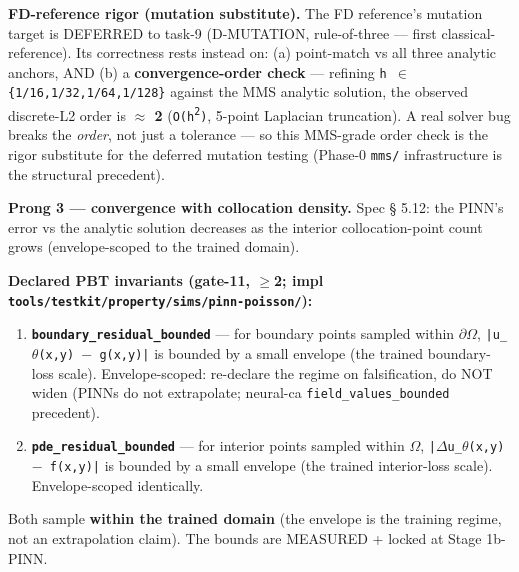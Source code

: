 \documentclass{bitphysics-preprint}
\begin{document}
\textbf{FD-reference rigor (mutation substitute).} The FD reference's mutation target is DEFERRED to task-9 (D-MUTATION, rule-of-three --- first classical-reference). Its correctness rests instead on: (a) point-match vs all three analytic anchors, AND (b) a \textbf{convergence-order check} --- refining \texttt{h $\in$ \{1/16,1/32,1/64,1/128\}} against the MMS analytic solution, the observed discrete-L2 order is \textbf{$\approx$ 2} (\texttt{O(h\textsuperscript{2})}, 5-point Laplacian truncation). A real solver bug breaks the \emph{order}, not just a tolerance --- so this MMS-grade order check is the rigor substitute for the deferred mutation testing (Phase-0 \texttt{mms/} infrastructure is the structural precedent).

\textbf{Prong 3 --- convergence with collocation density.} Spec \S{} 5.12: the PINN's error vs the analytic solution decreases as the interior collocation-point count grows (envelope-scoped to the trained domain).

\textbf{Declared PBT invariants (gate-11, $\geq$2; impl \texttt{tools/testkit/property/sims/pinn-poisson/}):}

\begin{enumerate}
  \item \textbf{\texttt{boundary\_residual\_bounded}} --- for boundary points sampled within \texttt{$\partial$$\Omega$}, \texttt{|u\_$\theta$(x,y) $-$ g(x,y)|} is bounded by a small envelope (the trained boundary-loss scale). Envelope-scoped: re-declare the regime on falsification, do NOT widen (PINNs do not extrapolate; neural-ca \texttt{field\_values\_bounded} precedent).
  \item \textbf{\texttt{pde\_residual\_bounded}} --- for interior points sampled within \texttt{$\Omega$}, \texttt{|$\Delta$u\_$\theta$(x,y) $-$ f(x,y)|} is bounded by a small envelope (the trained interior-loss scale). Envelope-scoped identically.
\end{enumerate}

Both sample \textbf{within the trained domain} (the envelope is the training regime, not an extrapolation claim). The bounds are MEASURED + locked at Stage 1b-PINN.

\nocite{*}


\end{document}
